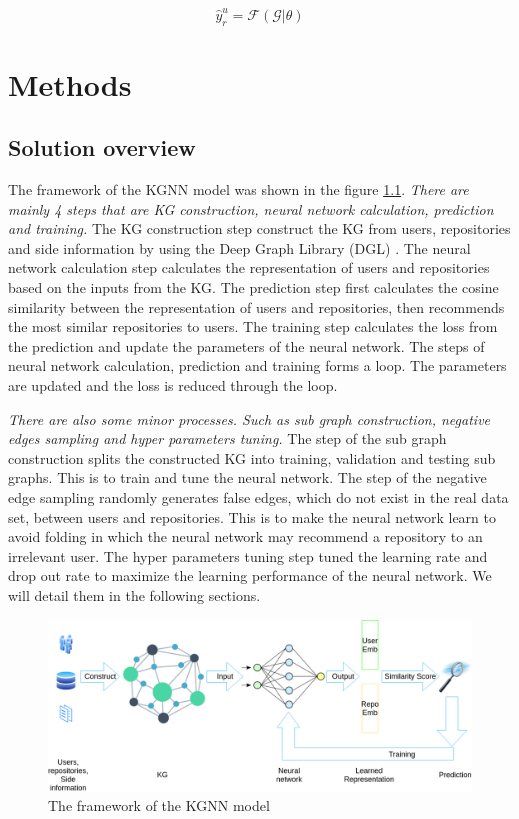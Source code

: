 \documentclass[11pt,twoside]{report}
\begin{document}
\begin{equation}
    \hat{y}_r^u=\mathcal{F}(\mathcal{G}|\theta)
    \label{eq:problem_framing}
\end{equation}

\chapter{Methods}
\section{Solution overview}
The framework of the KGNN model was shown in the figure \ref{fig:kgnn_framework}. \textit{There are mainly 4 steps that are KG construction, neural network calculation, prediction and training.} The KG construction step construct the KG from users, repositories and side information by using the Deep Graph Library (DGL) \cite{wang2019dgl}. The neural network calculation step calculates the representation of users and repositories based on the inputs from the KG. The prediction step first calculates the cosine similarity between the representation of users and repositories, then recommends the most similar repositories to users. The training step calculates the loss from the prediction and update the parameters of the neural network. The steps of neural network calculation, prediction and training forms a loop. The parameters are updated and the loss is reduced through the loop.

\textit{There are also some minor processes. Such as sub graph construction, negative edges sampling and hyper parameters tuning.} The step of the sub graph construction splits the constructed KG into training, validation and testing sub graphs. This is to train and tune the neural network. The step of the negative edge sampling randomly generates false edges, which do not exist in the real data set, between users and repositories. This is to make the neural network learn to avoid folding \cite{xin_folding_2017} in which the neural network may recommend a repository to an irrelevant user. The hyper parameters tuning step tuned the learning rate and drop out rate to maximize the learning performance of the neural network. We will detail them in the following sections.
 
\begin{figure}[H]
    \centering
    \includegraphics[scale=0.4]{KGCN Overview.png}
    \caption{The framework of the KGNN model}
    \label{fig:kgnn_framework}
\end{figure}
\end{document}
